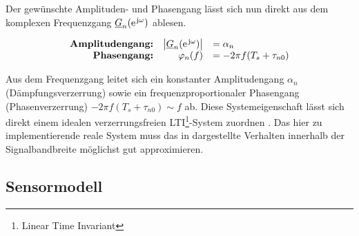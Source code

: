 Der gewünschte Amplituden- und Phasengang lässt sich nun direkt aus dem komplexen Frequenzgang $\underline{G}_n(\e^{\im \omega})$ ablesen.



\begin{equation}
    \begin{array}{rrl}
  \text{\textbf{Amplitudengang:}} &
  \left | \underline{G}_n(\e^{\im \omega}) \right | & = \alpha_n \\
    \text{\textbf{Phasengang:}} &
    \varphi_n(f) & = - 2 \pi f (T_s + \tau_{n0})
   \end{array}
  \label{eq:SystemEigenschaften}
\end{equation}
 

Aus dem Frequenzgang leitet sich ein konstanter Amplitudengang $\alpha_n$ (Dämpfungsverzerrung) sowie ein frequenzproportionaler Phasengang (Phasenverzerrung) $-2 \pi f  (T_s + \tau_{n0}) \sim f$ ab. Diese Systemeigenschaft lässt sich direkt einem idealen verzerrungsfreien LTI\footnote{Linear Time Invariant}-System zuordnen \cite[S. 63ff]{Book_SignalTransmission_Kammayer}. Das hier zu implementierende reale System muss das in  dargestellte Verhalten innerhalb der Signalbandbreite möglichst gut approximieren.





\subsection{Sensormodell}
\label{subsec:Sensormodell}

